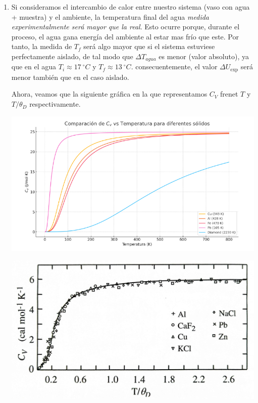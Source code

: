 \begin{enumerate}[label=\alph*)]
	\item Si consideramos el intercambio de calor entre nuestro sistema (vaso con agua + muestra) y el ambiente, la temperatura final del agua \textit{medida experimentalmente será mayor que la real}. Esto ocurre porque, durante el proceso, el agua gana energía del ambiente al estar mas frío que este. Por tanto, la medida de $T_f$ será algo mayor que si el sistema estuviese perfectamente aislado, de tal modo que $\Delta T_{agua}$ es menor (valor absoluto), ya que en el agua $T_i\approx 17 \ ^\circ C$ y $T_f \approx 13 \ ^\circ C$. consecuentemente, el valor $\Delta U_{\exp}$ será menor también que en el caso aislado.

	      Ahora, veamos que la siguiente gráfica en la que representamos $C_V$ frenet $T$ y $T/\theta_D$ respectivamente.

	      \begin{minipage}{0.47\linewidth}
		      \includegraphics[width=1\linewidth]{Cuerpo/Ch_02/Examen_24_5-2.png}
	      \end{minipage} \hfill
	      \begin{minipage}{0.47\linewidth}
		      \includegraphics[width=1\linewidth]{Cuerpo/Ch_02/Examen_24_5-3.png}
	      \end{minipage}


\end{enumerate}
